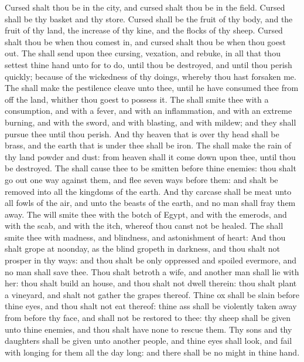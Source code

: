 \begin{biblechapter}
\verse Cursed shalt thou be in the city, and cursed shalt thou be in the field.
\verse Cursed shall be thy basket and thy store.
\verse Cursed shall be the fruit of thy body, and the fruit of thy land, the increase of thy kine, and the flocks of thy sheep.
\verse Cursed shalt thou be when thou comest in, and cursed shalt thou be when thou goest out.
\verse The \LORD shall send upon thee cursing, vexation, and rebuke, in all that thou settest thine hand unto for to do, until thou be destroyed, and until thou perish quickly; because of the wickedness of thy doings, whereby thou hast forsaken me.
\verse The \LORD shall make the pestilence cleave unto thee, until he have consumed thee from off the land, whither thou goest to possess it.
\verse The \LORD shall smite thee with a consumption, and with a fever, and with an inflammation, and with an extreme burning, and with the sword, and with blasting, and with mildew; and they shall pursue thee until thou perish.
\verse And thy heaven that is over thy head shall be brass, and the earth that is under thee shall be iron.
\verse The \LORD shall make the rain of thy land powder and dust: from heaven shall it come down upon thee, until thou be destroyed.
\verse The \LORD shall cause thee to be smitten before thine enemies: thou shalt go out one way against them, and flee seven ways before them: and shalt be removed into all the kingdoms of the earth.
\verse And thy carcase shall be meat unto all fowls of the air, and unto the beasts of the earth, and no man shall fray them away.
\verse The \LORD will smite thee with the botch of Egypt, and with the emerods, and with the scab, and with the itch, whereof thou canst not be healed.
\verse The \LORD shall smite thee with madness, and blindness, and astonishment of heart:
\verse And thou shalt grope at noonday, as the blind gropeth in darkness, and thou shalt not prosper in thy ways: and thou shalt be only oppressed and spoiled evermore, and no man shall save thee.
\verse Thou shalt betroth a wife, and another man shall lie with her: thou shalt build an house, and thou shalt not dwell therein: thou shalt plant a vineyard, and shalt not gather the grapes thereof.
\verse Thine ox shall be slain before thine eyes, and thou shalt not eat thereof: thine ass shall be violently taken away from before thy face, and shall not be restored to thee: thy sheep shall be given unto thine enemies, and thou shalt have none to rescue them.
\verse Thy sons and thy daughters shall be given unto another people, and thine eyes shall look, and fail with longing for them all the day long: and there shall be no might in thine hand.

\end{biblechapter}
